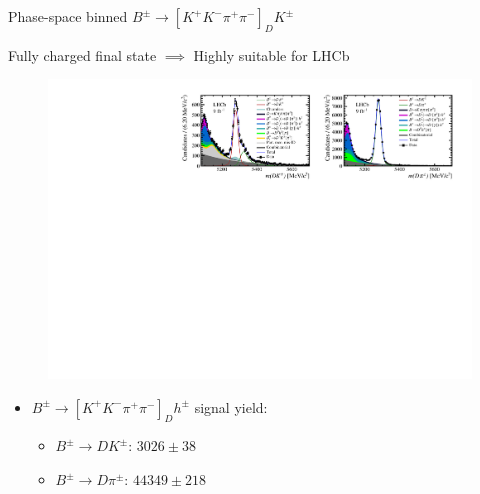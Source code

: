 \documentclass[xcolor={dvipsnames}]{beamer}
\begin{document}
\begin{frame}{Phase-space binned $B^\pm\to[K^+K^-\pi^+\pi^-]_DK^\pm$}
  \begin{center}
    {\large Fully charged final state $\implies$ Highly suitable for LHCb}
  \end{center}
  \begin{figure}
    \centering
    \includegraphics[width = 1.0\textwidth,trim={0 0 0 0},clip=true]{Plots/d2kkpipi_fiveL_allDP.pdf}
  \end{figure}
  \begin{itemize}
    \item{$B^\pm\to[K^+K^-\pi^+\pi^-]_Dh^\pm$ signal yield:}
    \begin{itemize}
      \item{$B^\pm\to DK^\pm$: $3026 \pm 38$}
      \item{$B^\pm\to D\pi^\pm$: $44349 \pm 218$}
    \end{itemize}
  \end{itemize}
\end{frame}
\end{document}
